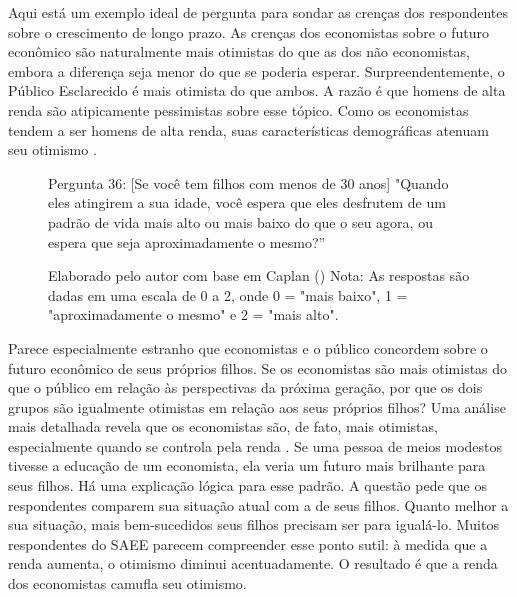 Aqui está um exemplo ideal de pergunta para sondar as crenças dos respondentes sobre o crescimento de longo prazo. As crenças dos economistas sobre o futuro econômico são naturalmente mais otimistas do que as dos não economistas, embora a diferença seja menor do que se poderia esperar. Surpreendentemente, o Público Esclarecido é mais otimista do que ambos. A razão é que homens de alta renda são atipicamente pessimistas sobre esse tópico. Como os economistas tendem a ser homens de alta renda, suas características demográficas atenuam seu otimismo \cite{The_Myth_of_the_Rational_Voter}.


\begin{figure}[H]
    \centering
    \caption*{Pergunta 36: [Se você tem filhos com menos de 30 anos] "Quando eles atingirem a sua idade, você espera que eles desfrutem de um padrão de vida mais alto ou mais baixo do que o seu agora, ou espera que seja aproximadamente o mesmo?”}
    \caption{Elaborado pelo autor com base em Caplan (\citeyear{The_Myth_of_the_Rational_Voter}) \newline
    Nota: As respostas são dadas em uma escala de 0 a 2, onde  0 = "mais baixo", 1 = "aproximadamente o mesmo" e 2 = "mais alto".}
    \label{fig:pergunta_36}
\end{figure}

Parece especialmente estranho que economistas e o público concordem sobre o futuro econômico de seus próprios filhos. Se os economistas são mais otimistas do que o público em relação às perspectivas da próxima geração, por que os dois grupos são igualmente otimistas em relação aos seus próprios filhos? Uma análise mais detalhada revela que os economistas são, de fato, mais otimistas, especialmente quando se controla pela renda \cite{The_Myth_of_the_Rational_Voter}. Se uma pessoa de meios modestos tivesse a educação de um economista, ela veria um futuro mais brilhante para seus filhos. Há uma explicação lógica para esse padrão. A questão pede que os respondentes comparem sua situação atual com a de seus filhos. Quanto melhor a sua situação, mais bem-sucedidos seus filhos precisam ser para igualá-lo. Muitos respondentes do SAEE parecem compreender esse ponto sutil: à medida que a renda aumenta, o otimismo diminui acentuadamente. O resultado é que a renda dos economistas camufla seu otimismo.



